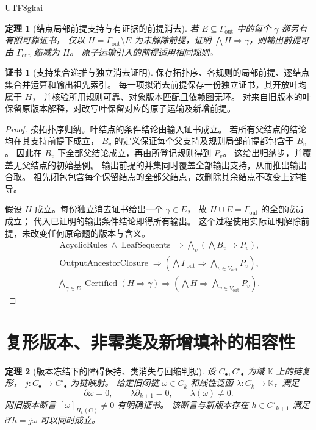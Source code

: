 \documentclass[12pt,a4paper,openany,notitlepage]{report}
\theoremstyle{plain}
\newtheorem{theorem}{定理}[chapter]
\theoremstyle{definition}
\newtheorem*{certificate}{证书}
\theoremstyle{remark}
\begin{document}
\begin{CJK*}{UTF8}{gkai}
\begin{theorem}[结点局部前提支持与有证据的前提消去]
若 $E\subseteq\Gamma_{\mathrm{out}}$ 中的每个 $\gamma$ 都另有有限可靠证书，
仅以 $H=\Gamma_{\mathrm{out}}\setminus E$ 为未解除前提，证明
$\bigwedge H\Rightarrow\gamma$，则输出前提可由
$\Gamma_{\mathrm{out}}$ 缩减为 $H$。
原子运输引入的前提适用相同规则。
\end{theorem}
\begin{certificate}[支持集合递推与独立消去证明]
保存拓扑序、各规则的局部前提、逐结点集合并运算和输出祖先索引。
每一项拟消去前提保存一份独立证书，其开放叶均属于 $H$，
并核验所用规则可靠、对象版本匹配且依赖图无环。
对来自旧版本的叶保留原版本解释，对改写叶保留对应的原子运输及新增前提。
\end{certificate}
\begin{proof}
按拓扑序归纳。叶结点的条件结论由输入证书成立。
若所有父结点的结论均在其支持前提下成立，
$B_v$ 的定义保证每个父支持及规则局部前提都包含于 $B_v$。
因此在 $B_v$ 下全部父结论成立，再由所登记规则得到 $P_v$。
这给出归纳步，并覆盖无父结点的初始基例。
输出前提的并集同时覆盖全部输出支持，从而推出输出合取。
祖先闭包包含每个保留结点的全部父结点，故删除其余结点不改变上述推导。

假设 $H$ 成立。每份独立消去证书给出一个 $\gamma\in E$，
故 $H\cup E=\Gamma_{\mathrm{out}}$ 的全部成员成立；
代入已证明的输出条件结论即得所有输出。
这个过程使用实际证明解除前提，未改变任何原命题的版本与含义。
\[
\begin{gathered}
 \operatorname{AcyclicRules}\land\operatorname{LeafSequents}
 \Rightarrow\bigwedge_v\left(\bigwedge B_v\Rightarrow P_v\right),\\
 \operatorname{OutputAncestorClosure}
 \Rightarrow\left(\bigwedge\Gamma_{\mathrm{out}}
 \Rightarrow\bigwedge_{v\in V_{\mathrm{out}}}P_v\right),\\
 \bigwedge_{\gamma\in E}\operatorname{Certified}(H\Rightarrow\gamma)
 \Rightarrow\left(\bigwedge H\Rightarrow
             \bigwedge_{v\in V_{\mathrm{out}}}P_v\right).
\end{gathered}
\]
\end{proof}

\section{复形版本、非零类及新增填补的相容性}
\label{exp:gov:homology-version-section}

\begin{theorem}[版本冻结下的障碍保持、类消失与回缩判据]
\label{exp:gov:homology-version}
设 $C_\bullet,C'_\bullet$ 为域 $\mathbb K$ 上的链复形，
$j:C_\bullet\to C'_\bullet$ 为链映射。
给定旧闭链 $\omega\in C_k$ 和线性泛函 $\lambda:C_k\to\mathbb K$，满足
\[
 \partial\omega=0,\qquad
 \lambda\partial_{k+1}=0,\qquad\lambda(\omega)\ne0.
\]
则旧版本断言 $[\omega]_{H_k(C)}\ne0$ 有明确证书。
该断言与新版本存在 $h\in C'_{k+1}$ 满足
$\partial'h=j\omega$ 可以同时成立。


\end{theorem}
\end{CJK*}
\end{document}
